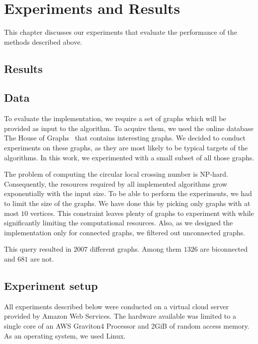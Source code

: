 \chapter{Experiments and Results}\label{ch:experiments-and-results}

This chapter discusses our experiments that evaluate the performance of the methods described above.

\section{Results}

\section{Data}

To evaluate the implementation, we require a set of graphs which will be provided as input to the algorithm. To acquire them, we used the online database The House of Graphs~\cite{HoG} that contains interesting graphs. We decided to conduct experiments on these graphs, as they are most likely to be typical targets of the algorithms. In this work, we experimented with a small subset of all those graphs.

The problem of computing the circular local crossing number is NP-hard. Consequently, the resources required by all implemented algorithms grow exponentially with the input size. To be able to perform the experiments, we had to limit the size of the graphs. We have done this by picking only graphs with at most \(10\) vertices. This constraint leaves plenty of graphs to experiment with while significantly limiting the computational resources. Also, as we designed the implementation only for connected graphs, we filtered out unconnected graphs.

This query resulted in \(2007\) different graphs. Among them \(1326\) are biconnected and \(681\) are not.


\section{Experiment setup}

All experiments described below were conducted on a virtual cloud server provided by Amazon Web Services. The hardware available was limited to a single core of an AWS Graviton4 Processor and 2GiB of random access memory. As an operating system, we used Linux.

